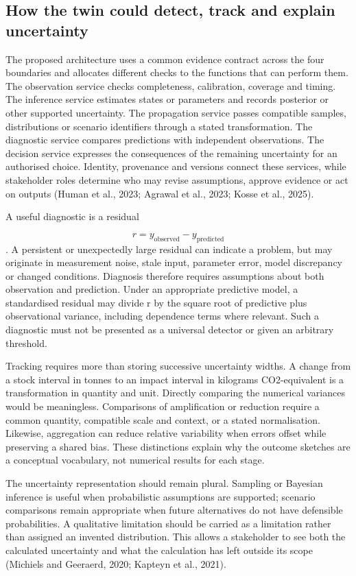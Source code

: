 \subsection{How the twin could detect, track and explain uncertainty}
The proposed architecture uses a common evidence contract across the four boundaries and allocates different checks to the functions that can perform them. The observation service checks completeness, calibration, coverage and timing. The inference service estimates states or parameters and records posterior or other supported uncertainty. The propagation service passes compatible samples, distributions or scenario identifiers through a stated transformation. The diagnostic service compares predictions with independent observations. The decision service expresses the consequences of the remaining uncertainty for an authorised choice. Identity, provenance and versions connect these services, while stakeholder roles determine who may revise assumptions, approve evidence or act on outputs (Human et al., 2023; Agrawal et al., 2023; Kosse et al., 2025).

A useful diagnostic is a residual 

\[
r=y_{\mathrm{observed}}-y_{\mathrm{predicted}}
\]
. A persistent or unexpectedly large residual can indicate a problem, but may originate in measurement noise, stale input, parameter error, model discrepancy or changed conditions. Diagnosis therefore requires assumptions about both observation and prediction. Under an appropriate predictive model, a standardised residual may divide r by the square root of predictive plus observational variance, including dependence terms where relevant. Such a diagnostic must not be presented as a universal detector or given an arbitrary threshold.

Tracking requires more than storing successive uncertainty widths. A change from a stock interval in tonnes to an impact interval in kilograms CO2-equivalent is a transformation in quantity and unit. Directly comparing the numerical variances would be meaningless. Comparisons of amplification or reduction require a common quantity, compatible scale and context, or a stated normalisation. Likewise, aggregation can reduce relative variability when errors offset while preserving a shared bias. These distinctions explain why the outcome sketches are a conceptual vocabulary, not numerical results for each stage.

The uncertainty representation should remain plural. Sampling or Bayesian inference is useful when probabilistic assumptions are supported; scenario comparisons remain appropriate when future alternatives do not have defensible probabilities. A qualitative limitation should be carried as a limitation rather than assigned an invented distribution. This allows a stakeholder to see both the calculated uncertainty and what the calculation has left outside its scope (Michiels and Geeraerd, 2020; Kapteyn et al., 2021).


